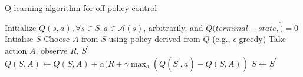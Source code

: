 \bgroup
\begin{frame}{Q-learning algorithm for off-policy control}
\begin{algorithmic}
\STATE Initialize $Q(s,a), \forall s \in S, a \in \mathcal{A}(s)$, arbitrarily, and $Q(terminal-state, \dot)=0$
\STATE Intialise $S$
\STATE Choose $A$ from $S$ using policy derived from $Q$ (e.g., $\epsilon$-greedy)
\STATE Take action $A$, observe $R$, $S^{\prime}$
\STATE $Q(S,A) \leftarrow Q(S,A) + \alpha (R + \gamma \max_{a}(Q(S^{\prime}, a) - Q(S,A))$
\STATE $S \leftarrow S^{\prime}$
\ENDFOR
\ENDFOR
\end{algorithmic}
\end{frame}
\egroup